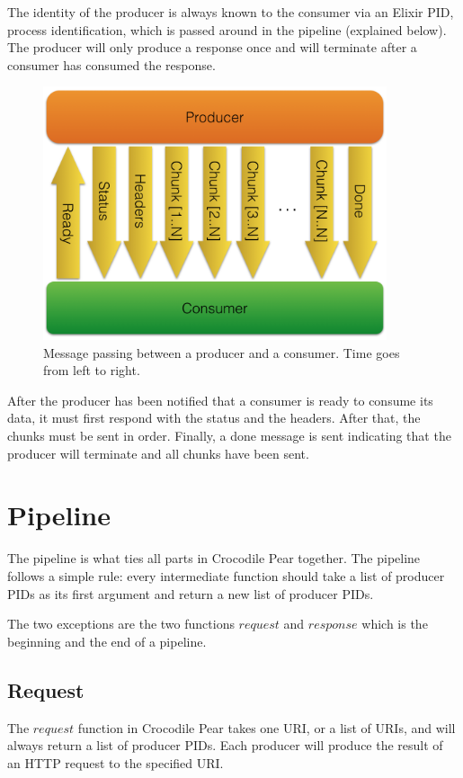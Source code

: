 \documentclass{cslthse-msc}
\begin{document}
The identity of the producer is always known to the consumer via an Elixir PID, process identification, which is passed around in the pipeline (explained below). The producer will only produce a response once and will terminate after a consumer has consumed the response.

\begin{figure}[H]
  \centering
    \begin{center}
      \includegraphics[width=0.9\textwidth]{images/crocpear_producer_consumer.png}
    \end{center}
  \caption{Message passing between a producer and a consumer. Time goes from left to right.}
\end{figure}

After the producer has been notified that a consumer is ready to consume its data, it must first respond with the status and the headers. After that, the chunks must be sent in order. Finally, a done message is sent indicating that the producer will terminate and all chunks have been sent.

\section{Pipeline}
The pipeline is what ties all parts in Crocodile Pear together. The pipeline follows a simple rule: every intermediate function should take a list of producer PIDs as its first argument and return a new list of producer PIDs.

The two exceptions are the two functions $request$ and $response$ which is the beginning and the end of a pipeline.

\subsection{Request}
The $request$ function in Crocodile Pear takes one URI, or a list of URIs, and will always return a list of producer PIDs. Each producer will produce the result of an HTTP request to the specified URI.
\end{document}

